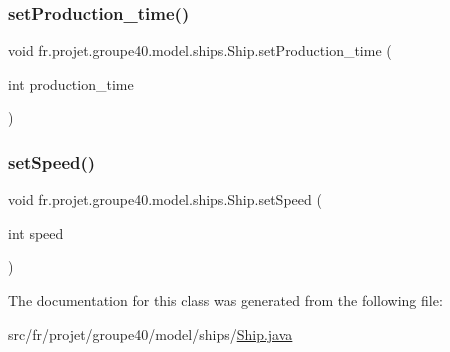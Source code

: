 \subsubsection{\texorpdfstring{set\+Production\+\_\+time()}{setProduction\_time()}}
{\footnotesize\ttfamily void fr.\+projet.\+groupe40.\+model.\+ships.\+Ship.\+set\+Production\+\_\+time (\begin{DoxyParamCaption}\item[{int}]{production\+\_\+time }\end{DoxyParamCaption})}

\mbox{\label{classfr_1_1projet_1_1groupe40_1_1model_1_1ships_1_1_ship_a1e9f20684a7337428f3eeba2751b3c9a}} 
\subsubsection{\texorpdfstring{set\+Speed()}{setSpeed()}}
{\footnotesize\ttfamily void fr.\+projet.\+groupe40.\+model.\+ships.\+Ship.\+set\+Speed (\begin{DoxyParamCaption}\item[{int}]{speed }\end{DoxyParamCaption})}



The documentation for this class was generated from the following file\+:\begin{DoxyCompactItemize}
\item 
src/fr/projet/groupe40/model/ships/\hyperlink{_ship_8java}{Ship.\+java}\end{DoxyCompactItemize}
